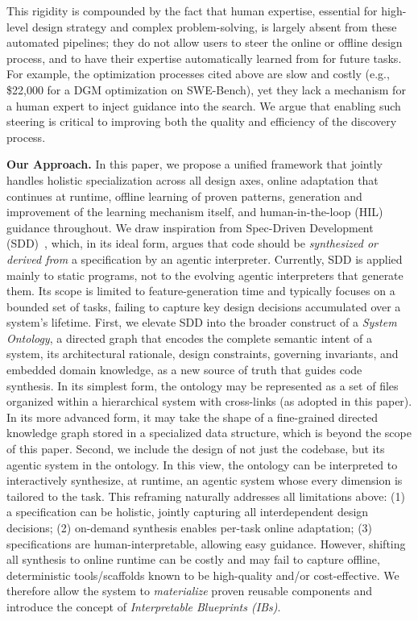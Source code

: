 This rigidity is compounded by the fact that human expertise, essential for high-level design strategy and complex problem-solving, is largely absent from these automated pipelines; they do not allow users to steer the online or offline design process, and to have their expertise automatically learned from for future tasks. For example, the optimization processes cited above are slow and costly (e.g., \$22{,}000 for a DGM optimization on SWE-Bench), yet they lack a mechanism for a human expert to inject guidance into the search. We argue that enabling such steering is critical to improving both the quality and efficiency of the discovery process.


\textbf{Our Approach.} In this paper, we propose a unified framework that jointly handles holistic specialization across all design axes, online adaptation that continues at runtime, offline learning of proven patterns, generation and improvement of the learning mechanism itself, and human-in-the-loop (HIL) guidance throughout. We draw inspiration from Spec-Driven Development (SDD)~\cite{piskala2025sdd,meng2025wysiwid,bockeler2025sddtools,gu2025challenges}, which, in its ideal form, argues that code should be \emph{synthesized or derived from} a specification by an agentic interpreter. 
Currently, SDD is applied mainly to static programs, not to the evolving agentic interpreters that generate them. Its scope is limited to feature-generation time and typically focuses on a bounded set of tasks, failing to capture key design decisions accumulated over a system’s lifetime. 
First, we elevate SDD into the broader construct of a \emph{System Ontology}, a directed graph that encodes the complete semantic intent of a system, its architectural rationale, design constraints, governing invariants, and embedded domain knowledge, as a new source of truth that guides code synthesis. 
In its simplest form, the ontology may be represented as a set of files organized within a hierarchical system with cross-links (as adopted in this paper). In its more advanced form, it may take the shape of a fine-grained directed knowledge graph stored in a specialized data structure, which is beyond the scope of this paper.
Second, we include the design of not just the codebase, but its agentic system in the ontology. In this view, the ontology can be interpreted to interactively synthesize, at runtime, an agentic system whose every dimension is tailored to the task.
This reframing naturally addresses all limitations above: (1) a specification can be holistic, jointly capturing all interdependent design decisions; (2) on-demand synthesis enables per-task online adaptation; (3) specifications are human-interpretable, allowing easy guidance. However, shifting all synthesis to online runtime can be costly and may fail to capture offline, deterministic tools/scaffolds known to be high-quality and/or cost-effective. We therefore allow the system to \textit{materialize} proven reusable components and introduce the concept of \textit{Interpretable Blueprints (IBs)}.

